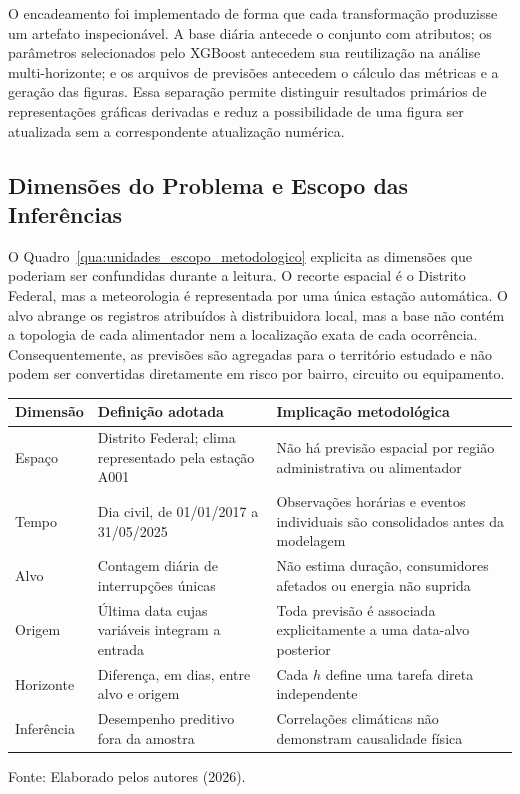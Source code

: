 O encadeamento foi implementado de forma que cada transformação produzisse um artefato inspecionável. A base diária antecede o conjunto com atributos; os parâmetros selecionados pelo XGBoost antecedem sua reutilização na análise multi-horizonte; e os arquivos de previsões antecedem o cálculo das métricas e a geração das figuras. Essa separação permite distinguir resultados primários de representações gráficas derivadas e reduz a possibilidade de uma figura ser atualizada sem a correspondente atualização numérica.

\subsection{Dimensões do Problema e Escopo das Inferências}

O Quadro~\ref{qua:unidades_escopo_metodologico} explicita as dimensões que poderiam ser confundidas durante a leitura. O recorte espacial é o Distrito Federal, mas a meteorologia é representada por uma única estação automática. O alvo abrange os registros atribuídos à distribuidora local, mas a base não contém a topologia de cada alimentador nem a localização exata de cada ocorrência. Consequentemente, as previsões são agregadas para o território estudado e não podem ser convertidas diretamente em risco por bairro, circuito ou equipamento.

\begin{quadro}[H]
\centering
\caption{Unidades, granularidades e limites operacionais do estudo}
\label{qua:unidades_escopo_metodologico}
\small
\begin{tabularx}{\textwidth}{p{3.3cm} X X}
\toprule
\textbf{Dimensão} & \textbf{Definição adotada} & \textbf{Implicação metodológica} \\
\midrule
Espaço & Distrito Federal; clima representado pela estação A001 & Não há previsão espacial por região administrativa ou alimentador \\
Tempo & Dia civil, de 01/01/2017 a 31/05/2025 & Observações horárias e eventos individuais são consolidados antes da modelagem \\
Alvo & Contagem diária de interrupções únicas & Não estima duração, consumidores afetados ou energia não suprida \\
Origem & Última data cujas variáveis integram a entrada & Toda previsão é associada explicitamente a uma data-alvo posterior \\
Horizonte & Diferença, em dias, entre alvo e origem & Cada $h$ define uma tarefa direta independente \\
Inferência & Desempenho preditivo fora da amostra & Correlações climáticas não demonstram causalidade física \\
\bottomrule
\end{tabularx}
\small{Fonte: Elaborado pelos autores (2026).}
\end{quadro}

